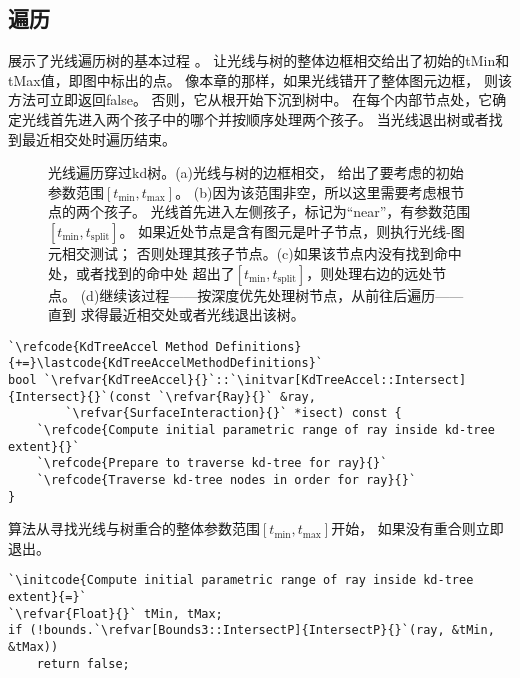 \subsection{遍历}\label{sub:遍历2}
展示了光线遍历树的基本过程
。
让光线与树的整体边框相交给出了初始的{\ttfamily tMin}和{\ttfamily tMax}值，即图中标出的点。
像本章的那样，如果光线错开了整体图元边框，
则该方法可立即返回{\ttfamily false}。
否则，它从根开始下沉到树中。
在每个内部节点处，它确定光线首先进入两个孩子中的哪个并按顺序处理两个孩子。
当光线退出树或者找到最近相交处时遍历结束。
\begin{figure}[htbp]
    \centering
    \caption{光线遍历穿过kd树。(a)光线与树的边框相交，
    给出了要考虑的初始参数范围$[t_{\min},t_{\max}]$。
    (b)因为该范围非空，所以这里需要考虑根节点的两个孩子。
    光线首先进入左侧孩子，标记为“near”，有参数范围$[t_{\min},t_{\text{split}}]$。
    如果近处节点是含有图元是叶子节点，则执行光线-图元相交测试；
    否则处理其孩子节点。(c)如果该节点内没有找到命中处，或者找到的命中处
    超出了$[t_{\min},t_{\text{split}}]$，则处理右边的远处节点。
    (d)继续该过程——按深度优先处理树节点，从前往后遍历——直到
    求得最近相交处或者光线退出该树。}
    \label{fig:4.17}
\end{figure}
\begin{lstlisting}
`\refcode{KdTreeAccel Method Definitions}{+=}\lastcode{KdTreeAccelMethodDefinitions}`
bool `\refvar{KdTreeAccel}{}`::`\initvar[KdTreeAccel::Intersect]{Intersect}{}`(const `\refvar{Ray}{}` &ray,
        `\refvar{SurfaceInteraction}{}` *isect) const {
    `\refcode{Compute initial parametric range of ray inside kd-tree extent}{}`
    `\refcode{Prepare to traverse kd-tree for ray}{}`
    `\refcode{Traverse kd-tree nodes in order for ray}{}`
}
\end{lstlisting}

算法从寻找光线与树重合的整体参数范围$[t_{\min},t_{\max}]$开始，
如果没有重合则立即退出。
\begin{lstlisting}
`\initcode{Compute initial parametric range of ray inside kd-tree extent}{=}`
`\refvar{Float}{}` tMin, tMax;
if (!bounds.`\refvar[Bounds3::IntersectP]{IntersectP}{}`(ray, &tMin, &tMax)) 
    return false;
\end{lstlisting}

